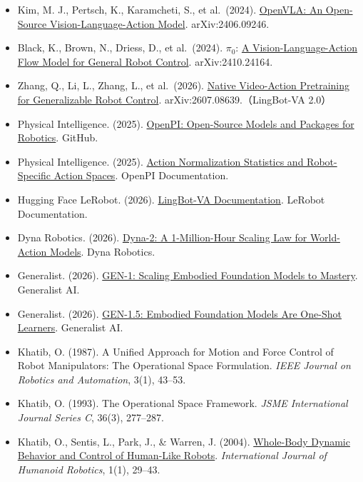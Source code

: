 \begin{itemize}
\tightlist
\item
  Kim, M. J., Pertsch, K., Karamcheti, S., et al.~(2024). \href{https://arxiv.org/abs/2406.09246}{OpenVLA: An Open-Source Vision-Language-Action Model}. arXiv:2406.09246.
\item
  Black, K., Brown, N., Driess, D., et al.~(2024). \(\pi_0\): \href{https://arxiv.org/abs/2410.24164}{A Vision-Language-Action Flow Model for General Robot Control}. arXiv:2410.24164.
\item
  Zhang, Q., Li, L., Zhang, L., et al.~(2026). \href{https://arxiv.org/abs/2607.08639}{Native Video-Action Pretraining for Generalizable Robot Control}. arXiv:2607.08639.（LingBot-VA 2.0）
\item
  Physical Intelligence. (2025). \href{https://github.com/Physical-Intelligence/openpi}{OpenPI: Open-Source Models and Packages for Robotics}. GitHub.
\item
  Physical Intelligence. (2025). \href{https://github.com/Physical-Intelligence/openpi/blob/main/docs/norm_stats.md}{Action Normalization Statistics and Robot-Specific Action Spaces}. OpenPI Documentation.
\item
  Hugging Face LeRobot. (2026). \href{https://huggingface.co/docs/lerobot/main/lingbot_va}{LingBot-VA Documentation}. LeRobot Documentation.
\item
  Dyna Robotics. (2026). \href{https://www.dyna.co/dyna-2}{Dyna-2: A 1-Million-Hour Scaling Law for World-Action Models}. Dyna Robotics.
\item
  Generalist. (2026). \href{https://generalistai.com/blog/gen-1}{GEN-1: Scaling Embodied Foundation Models to Mastery}. Generalist AI.
\item
  Generalist. (2026). \href{https://generalistai.com/blog/gen-1.5}{GEN-1.5: Embodied Foundation Models Are One-Shot Learners}. Generalist AI.
\item
  Khatib, O. (1987). A Unified Approach for Motion and Force Control of Robot Manipulators: The Operational Space Formulation. \emph{IEEE Journal on Robotics and Automation}, 3(1), 43--53.
\item
  Khatib, O. (1993). The Operational Space Framework. \emph{JSME International Journal Series C}, 36(3), 277--287.
\item
  Khatib, O., Sentis, L., Park, J., \& Warren, J. (2004). \href{https://khatib.stanford.edu/publications/pdfs/Khatib_2004_IJHR.pdf}{Whole-Body Dynamic Behavior and Control of Human-Like Robots}. \emph{International Journal of Humanoid Robotics}, 1(1), 29--43.

\end{itemize}
